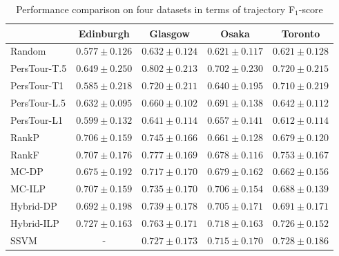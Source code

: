 \begin{table*}
\centering
\caption{Performance comparison on four datasets in terms of trajectory F$_1$-score}
\label{table:f1}
\begin{tabular}{l|cccc} \hline
 & Edinburgh & Glasgow & Osaka & Toronto \\ \hline
Random & $0.577\pm0.126$ & $0.632\pm0.124$ & $0.621\pm0.117$ & $0.621\pm0.128$ \\
PersTour-T.5 & $0.649\pm0.250$ & $\mathbf{0.802\pm0.213}$ & $0.702\pm0.230$ & $0.720\pm0.215$ \\
PersTour-T1 & $0.585\pm0.218$ & $0.720\pm0.211$ & $0.640\pm0.195$ & $0.710\pm0.219$ \\
PersTour-L.5 & $0.632\pm0.095$ & $0.660\pm0.102$ & $0.691\pm0.138$ & $0.642\pm0.112$ \\
PersTour-L1 & $0.599\pm0.132$ & $0.641\pm0.114$ & $0.657\pm0.141$ & $0.612\pm0.114$ \\
RankP & $0.706\pm0.159$ & $0.745\pm0.166$ & $0.661\pm0.128$ & $0.679\pm0.120$ \\
RankF & $0.707\pm0.176$ & $0.777\pm0.169$ & $0.678\pm0.116$ & $\mathbf{0.753\pm0.167}$ \\
MC-DP & $0.675\pm0.192$ & $0.717\pm0.170$ & $0.679\pm0.162$ & $0.662\pm0.156$ \\
MC-ILP & $0.707\pm0.159$ & $0.735\pm0.170$ & $0.706\pm0.154$ & $0.688\pm0.139$ \\
Hybrid-DP & $0.692\pm0.198$ & $0.739\pm0.178$ & $0.705\pm0.171$ & $0.691\pm0.171$ \\
Hybrid-ILP & $\mathbf{0.727\pm0.163}$ & $0.763\pm0.171$ & $\mathbf{0.718\pm0.163}$ & $0.726\pm0.152$ \\
SSVM & - & $0.727\pm0.173$ & $0.715\pm0.170$ & $0.728\pm0.186$ \\
\hline
\end{tabular}
\end{table*}


